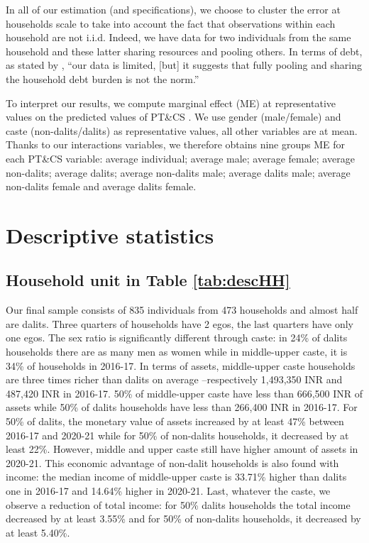\documentclass[a4paper, 11pt, onecolumn]{article}
\begin{document}
In all of our estimation (and specifications), we choose to cluster the error at households scale to take into account the fact that observations within each household are not i.i.d.
Indeed, we have data for two individuals from the same household and these latter sharing resources and pooling others.%
In terms of debt, as stated by \cite{Reboul2021}, ``our data is limited, [but] it suggests that fully pooling and sharing the household debt burden is not the norm.''

To interpret our results, we compute marginal effect (ME) at representative values on the predicted values of PT\&CS \cite{Williams2012}.
We use gender (male/female) and caste (non-dalits/dalits) as representative values, all other variables are at mean.
Thanks to our interactions variables, we therefore obtains nine groups ME for each PT\&CS variable: average individual; average male; average female; average non-dalits; average dalits; average non-dalits male; average dalits male; average non-dalits female and average dalits female. 





\newpage
\section{Descriptive statistics}

\subsection{Household unit in Table \ref{tab:descHH}}
Our final sample consists of 835 individuals from 473 households and almost half are dalits.
Three quarters of households have 2 egos, the last quarters have only one egos.
The sex ratio is significantly different through caste: in 24\% of dalits households there are as many men as women while in middle-upper caste, it is 34\% of households in 2016-17.
In terms of assets, middle-upper caste households are three times richer than dalits on average --respectively 1,493,350 INR and 487,420 INR in 2016-17.
50\% of middle-upper caste have less than 666,500 INR of assets while 50\% of dalits households have less than 266,400 INR in 2016-17.
For 50\% of dalits, the monetary value of assets increased by at least 47\% between 2016-17 and 2020-21 while for 50\% of non-dalits households, it decreased by at least 22\%.
However, middle and upper caste still have higher amount of assets in 2020-21.
This economic advantage of non-dalit households is also found with income: the median income of middle-upper caste is 33.71\% higher than dalits one in 2016-17 and 14.64\% higher in 2020-21.
Last, whatever the caste, we observe a reduction of total income: for 50\% dalits households the total income decreased by at least 3.55\% and for 50\% of non-dalits households, it decreased by at least 5.40\%.
		
\end{document}
